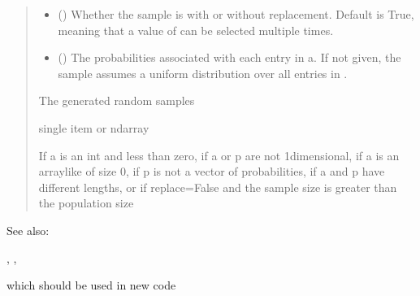 \documentclass[letterpaper,10pt,english]{sphinxmanual}
\begin{document}
\begin{fulllineitems}
\begin{quote}
\begin{description}
\begin{itemize}
\item {} 
\sphinxAtStartPar
{} (\sphinxstyleliteralemphasis{\sphinxupquote{, }}) \textendash{} Whether the sample is with or without replacement. Default is True,
meaning that a value of  can be selected multiple times.

\item {} 
\sphinxAtStartPar
{} (\sphinxstyleliteralemphasis{\sphinxupquote{, }}) \textendash{} The probabilities associated with each entry in a.
If not given, the sample assumes a uniform distribution over all
entries in .

\end{itemize}

\sphinxAtStartPar
{} \textendash{} The generated random samples

\sphinxAtStartPar
single item or ndarray

\sphinxAtStartPar
{} \textendash{} If a is an int and less than zero, if a or p are not 1\sphinxhyphen{}dimensional,
    if a is an array\sphinxhyphen{}like of size 0, if p is not a vector of
    probabilities, if a and p have different lengths, or if
    replace=False and the sample size is greater than the population
    size

\end{description}\end{quote}


\begin{sphinxseealso}{See also:}

\sphinxAtStartPar
{\hyperref[\detokenize{metilda.controllers:metilda.controllers.pitch_art_wizard.randint}]{}}, {\hyperref[\detokenize{metilda.controllers:metilda.controllers.pitch_art_wizard.shuffle}]{}}, {\hyperref[\detokenize{metilda.controllers:metilda.controllers.pitch_art_wizard.permutation}]{}}
\begin{description}
\sphinxAtStartPar
which should be used in new code


\end{description}
\end{sphinxseealso}
\end{fulllineitems}
\end{document}
